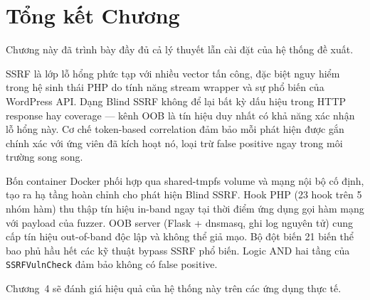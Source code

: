 \section{Tổng kết Chương}

Chương này đã trình bày đầy đủ cả lý thuyết lẫn cài đặt của hệ thống đề xuất.

SSRF là lớp lỗ hổng phức tạp với nhiều vector tấn công, đặc biệt nguy hiểm
trong hệ sinh thái PHP do tính năng stream wrapper và sự phổ biến của
WordPress API. Dạng Blind SSRF không để lại bất kỳ dấu hiệu trong HTTP
response hay coverage --- kênh OOB là tín hiệu duy nhất có khả năng xác nhận
lỗ hổng này. Cơ chế token-based correlation đảm bảo mỗi phát hiện được gắn
chính xác với ứng viên đã kích hoạt nó, loại trừ false positive ngay trong
môi trường song song.

Bốn container Docker phối hợp qua shared-tmpfs volume và mạng nội bộ cố định,
tạo ra hạ tầng hoàn chỉnh cho phát hiện Blind SSRF. Hook PHP (23 hook trên
5 nhóm hàm) thu thập tín hiệu in-band ngay tại thời điểm ứng dụng gọi hàm
mạng với payload của fuzzer. OOB server (Flask + dnsmasq, ghi log nguyên tử)
cung cấp tín hiệu out-of-band độc lập và không thể giả mạo. Bộ đột biến 21
biến thể bao phủ hầu hết các kỹ thuật bypass SSRF phổ biến. Logic AND hai
tầng của \texttt{SSRFVulnCheck} đảm bảo không có false positive.

Chương~4 sẽ đánh giá hiệu quả của hệ thống này trên các ứng dụng thực tế.
